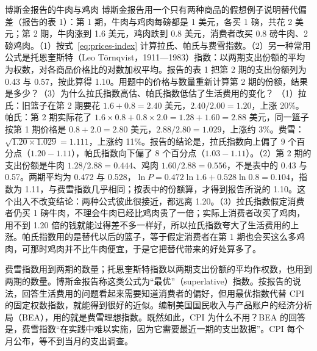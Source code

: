 \begin{example}{博斯金报告的牛肉与鸡肉}\label{ex:prices-beef}
博斯金报告用一个只有两种商品的假想例子说明替代偏差（报告的表 1）：第 1 期，牛肉与鸡肉每磅都是 1 美元，各买 1 磅，共花 2 美元；第 2 期，牛肉涨到 1.6 美元，鸡肉跌到 0.8 美元，消费者改买 0.8 磅牛肉、2 磅鸡肉\cite{boskin1996}。（1）按式~\eqref{eq:prices-index} 计算拉氏、帕氏与费雪指数。（2）另一种常用公式是托恩奎斯特（Leo Törnqvist，1911—1983）指数：以两期支出份额的平均为权数，对各商品价格比的对数加权平均。报告的表 1 把第 2 期的支出份额列为 0.43 与 0.57，按此算得 1.10。用题中的价格与数量重新计算第 2 期的份额，结果是多少？（3）为什么拉氏指数高估、帕氏指数低估了生活费用的变化？
\solution （1）拉氏：旧篮子在第 2 期要花 $1.6+0.8=2.40$ 美元，$2.40/2.00=1.20$，上涨 20\%。帕氏：第 2 期实际花了 $1.6\times0.8+0.8\times2.0=1.28+1.60=2.88$ 美元，同一篮子按第 1 期价格是 $0.8+2.0=2.80$ 美元，$2.88/2.80=1.029$，上涨约 3\%。费雪：$\sqrt{1.20\times1.029}=1.111$，上涨约 11\%。报告的结论是，拉氏指数向上偏了 9 个百分点（$1.20-1.11$），帕氏指数向下偏了 8 个百分点（$1.03-1.11$）\cite{boskin1996}。（2）第 2 期的支出份额是牛肉 $1.28/2.88=0.444$、鸡肉 $1.60/2.88=0.556$，不是表中的 0.43 与 0.57。两期平均为 0.472 与 0.528，$\ln P=0.472\ln1.6+0.528\ln0.8=0.104$，指数为 1.11，与费雪指数几乎相同；按表中的份额算，才得到报告所说的 1.10。这个出入不改变结论：两种公式彼此很接近，都远离 1.20。（3）拉氏指数假定消费者仍买 1 磅牛肉，不理会牛肉已经比鸡肉贵了一倍；实际上消费者改买了鸡肉，用不到 1.20 倍的钱就能过得差不多一样好，所以拉氏指数夸大了生活费用的上涨。帕氏指数用的是替代以后的篮子，等于假定消费者在第 1 期也会买这么多鸡肉，可那时鸡肉并不比牛肉便宜，于是它把替代带来的好处算多了。
\end{example}

费雪指数用到两期的数量；托恩奎斯特指数以两期支出份额的平均作权数，也用到两期的数量。博斯金报告称这类公式为“最优”（superlative）指数。按报告的说法，回答生活费用的问题看起来需要知道消费者的偏好，但用最优指数代替 CPI 的固定权数指数，就能得到很好的近似\cite{boskin1996}。编制美国国民收入与产品账户的经济分析局（BEA），用的就是费雪理想指数\cite{boskin1996}。既然如此，CPI 为什么不用？BEA 的回答是，费雪指数“在实践中难以实施，因为它需要最近一期的支出数据”\cite{mccully2007}。CPI 每个月公布，等不到当月的支出调查。


